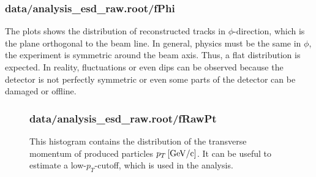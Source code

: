 \documentclass{article}
\begin{document}
\subsubsection*{data/analysis\_esd\_raw.root/fPhi}
The plots shows the distribution of reconstructed tracks in $\phi$-direction, which is the plane orthogonal to the beam line. In general, physics must be the same in $\phi$, the experiment is symmetric around the beam axis. Thus, a flat distribution is expected. In reality, fluctuations or even dips can be observed because the detector is not perfectly symmetric or even some parts of the detector can be damaged or offline.
\begin{figure}[H]
\begin{minipage}[b]{0.55\textwidth}
\subsubsection*{data/analysis\_esd\_raw.root/fRawPt}
This histogram contains the distribution of the transverse momentum of produced particles $\unit[p_{T}]{[GeV/c]}$. It can be useful to estimate a low-$p_{T}$-cutoff, which is used in the analysis.

\end{minipage}
\end{figure}
\end{document}
